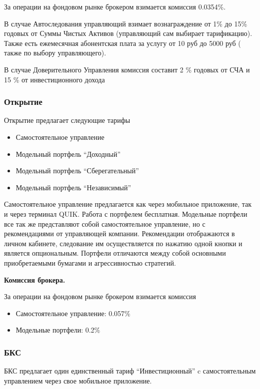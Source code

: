  За операции на фондовом рынке брокером взимается комиссия 0.0354\%. 

В случае Автоследования управляющий взимает вознаграждение от 1\% до 15\% годовых от Суммы Чистых Активов (управляющий сам выбирает тарификацию). Также есть ежемесячная абонентская плата за услугу от 10 руб до 5000 руб ( также по выбору управляющего). 

В случае Доверительного Управления комиссия составит 2 \% годовых от СЧА и 15 \% от инвестиционного дохода

\subsubsection{Открытие}
Открытие предлагает следующие тарифы
\begin{itemize}
    \item Самостоятельное управление
    \item Модельный портфель ``Доходный''
    \item Модельный портфель ``Сберегательный''
    \item Модельный портфель ``Независимый''
\end{itemize}

Самостоятельное управление предлагается как через мобильное приложение, так и через терминал QUIK. Работа с портфелем бесплатная. Модельные портфели все так же представляют собой самостоятельное управление, но с рекомендациями от управляющей компании. Рекомендации отображаются в личном кабинете, следование им осуществляется по нажатию одной кнопки и является опциональным. Портфели отличаются между собой основными приобретаемыми бумагами и агрессивностью стратегий.

\textbf{Комиссия брокера.}

За операции на фондовом рынке брокером взимается комиссия
\begin{itemize}
    \item Самостоятельное управление: 0.057\%
    \item Модельные портфели: 0.2\%
\end{itemize}


\subsubsection{БКС}
БКС предлагает один единственный тариф ``Инвестиционный'' c самостоятельным управлением через свое мобильное приложение.



